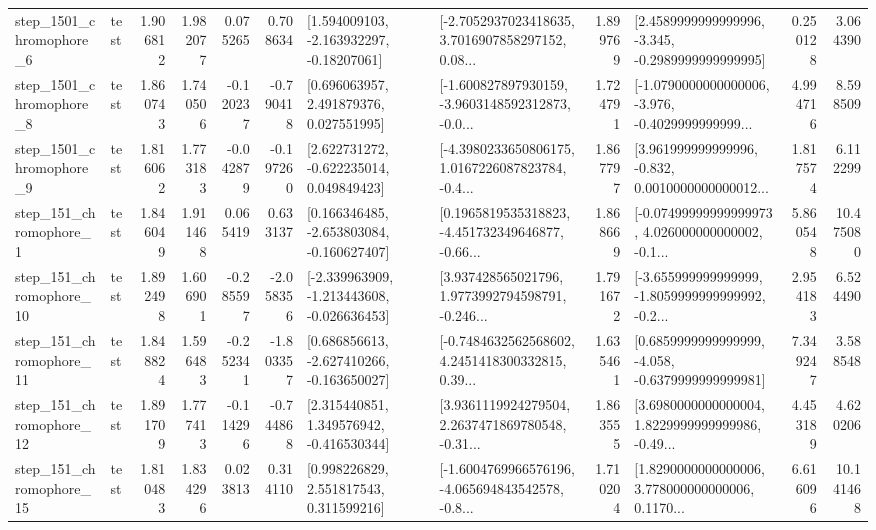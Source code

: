 \begin{tabular}{llrrrrllrlrr}
  step\_1501\_chromophore\_6 &      test &      1.906812 &    1.982077 &      0.075265 &  0.708634 &    [1.594009103, -2.163932297, -0.18207061] &  [-2.7052937023418635, 3.7016907858297152, 0.08... &       1.899769 &  [2.4589999999999996, -3.345, -0.2989999999999995] &            0.250128 &          3.064390 \\
  step\_1501\_chromophore\_8 &      test &      1.860743 &    1.740506 &     -0.120237 & -0.790418 &     [0.696063957, 2.491879376, 0.027551995] &  [-1.600827897930159, -3.9603148592312873, -0.0... &       1.724791 &  [-1.0790000000000006, -3.976, -0.4029999999999... &            4.994716 &          8.598509 \\
  step\_1501\_chromophore\_9 &      test &      1.816062 &    1.773183 &     -0.042879 & -0.197260 &    [2.622731272, -0.622235014, 0.049849423] &  [-4.3980233650806175, 1.0167226087823784, -0.4... &       1.867797 &  [3.961999999999996, -0.832, 0.0010000000000012... &            1.817574 &          6.112299 \\
   step\_151\_chromophore\_1 &      test &      1.846049 &    1.911468 &      0.065419 &  0.633137 &   [0.166346485, -2.653803084, -0.160627407] &  [0.1965819535318823, -4.451732349646877, -0.66... &       1.868669 &  [-0.07499999999999973, 4.026000000000002, -0.1... &            5.860548 &         10.475080 \\
  step\_151\_chromophore\_10 &      test &      1.892498 &    1.606901 &     -0.285597 & -2.058356 &  [-2.339963909, -1.213443608, -0.026636453] &  [3.937428565021796, 1.9773992794598791, -0.246... &       1.791672 &  [-3.655999999999999, -1.8059999999999992, -0.2... &            2.954183 &          6.524490 \\
  step\_151\_chromophore\_11 &      test &      1.848824 &    1.596483 &     -0.252341 & -1.803357 &   [0.686856613, -2.627410266, -0.163650027] &  [-0.7484632562568602, 4.2451418300332815, 0.39... &       1.635461 &  [0.6859999999999999, -4.058, -0.6379999999999981] &            7.349247 &          3.588548 \\
  step\_151\_chromophore\_12 &      test &      1.891709 &    1.777413 &     -0.114296 & -0.744868 &    [2.315440851, 1.349576942, -0.416530344] &  [3.9361119924279504, 2.2637471869780548, -0.31... &       1.863555 &  [3.6980000000000004, 1.8229999999999986, -0.49... &            4.453189 &          4.620206 \\
  step\_151\_chromophore\_15 &      test &      1.810483 &    1.834296 &      0.023813 &  0.314110 &     [0.998226829, 2.551817543, 0.311599216] &  [-1.6004769966576196, -4.065694843542578, -0.8... &       1.710204 &  [1.8290000000000006, 3.778000000000006, 0.1170... &            6.616096 &         10.141468 \\

\end{tabular}
